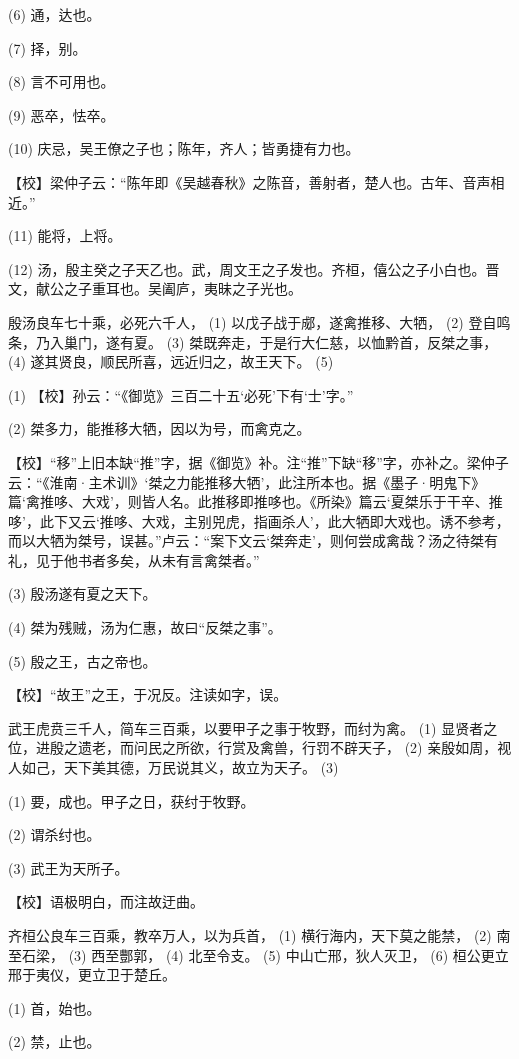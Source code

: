 \documentclass[12pt,UTF8]{ctexbook}
\begin{document}
(6) 通，达也。

(7) 择，别。

(8) 言不可用也。

(9) 恶卒，怯卒。

(10) 庆忌，吴王僚之子也；陈年，齐人；皆勇捷有力也。

【校】梁仲子云：“陈年即《吴越春秋》之陈音，善射者，楚人也。古年、音声相近。”

(11) 能将，上将。

(12) 汤，殷主癸之子天乙也。武，周文王之子发也。齐桓，僖公之子小白也。晋文，献公之子重耳也。吴阖庐，夷昧之子光也。

殷汤良车七十乘，必死六千人， (1) 以戊子战于郕，遂禽推移、大牺， (2) 登自鸣条，乃入巢门，遂有夏。 (3) 桀既奔走，于是行大仁慈，以恤黔首，反桀之事， (4) 遂其贤良，顺民所喜，远近归之，故王天下。 (5)

(1) 【校】孙云：“《御览》三百二十五‘必死’下有‘士’字。”

(2) 桀多力，能推移大牺，因以为号，而禽克之。

【校】“移”上旧本缺“推”字，据《御览》补。注“推”下缺“移”字，亦补之。梁仲子云：“《淮南·主术训》‘桀之力能推移大牺’，此注所本也。据《墨子·明鬼下》篇‘禽推哆、大戏’，则皆人名。此推移即推哆也。《所染》篇云‘夏桀乐于干辛、推哆’，此下又云‘推哆、大戏，主别兕虎，指画杀人’，此大牺即大戏也。诱不参考，而以大牺为桀号，误甚。”卢云：“案下文云‘桀奔走’，则何尝成禽哉？汤之待桀有礼，见于他书者多矣，从未有言禽桀者。”

(3) 殷汤遂有夏之天下。

(4) 桀为残贼，汤为仁惠，故曰“反桀之事”。

(5) 殷之王，古之帝也。

【校】“故王”之王，于况反。注读如字，误。

武王虎贲三千人，简车三百乘，以要甲子之事于牧野，而纣为禽。 (1) 显贤者之位，进殷之遗老，而问民之所欲，行赏及禽兽，行罚不辟天子， (2) 亲殷如周，视人如己，天下美其德，万民说其义，故立为天子。 (3)

(1) 要，成也。甲子之日，获纣于牧野。

(2) 谓杀纣也。

(3) 武王为天所子。

【校】语极明白，而注故迂曲。

齐桓公良车三百乘，教卒万人，以为兵首， (1) 横行海内，天下莫之能禁， (2) 南至石梁， (3) 西至酆郭， (4) 北至令支。 (5) 中山亡邢，狄人灭卫， (6) 桓公更立邢于夷仪，更立卫于楚丘。

(1) 首，始也。

(2) 禁，止也。
\end{document}
